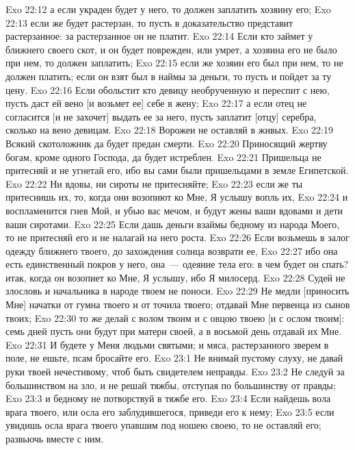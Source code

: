 \vs Exo 22:12 а если украден будет у него, то должен заплатить хозяину его;
\vs Exo 22:13 если же будет  растерзан, то пусть в доказательство представит растерзанное: за растерзанное он не платит.
\rsbpar\vs Exo 22:14 Если кто займет у ближнего своего скот, и он будет поврежден, или умрет, а хозяина его не было при нем, то должен заплатить;
\vs Exo 22:15 если же хозяин его был при нем, то не должен платить; если он взят был в наймы за деньги, то пусть и пойдет за ту цену.
\rsbpar\vs Exo 22:16 Если обольстит кто девицу необрученную и переспит с нею, пусть даст ей вено [и возьмет ее] себе в жену;
\vs Exo 22:17 а если отец не согласится [и не захочет] выдать ее за него, пусть заплатит [отцу]  серебра, сколько  на вено девицам.
\rsbpar\vs Exo 22:18 Ворожеи не оставляй в живых.
\rsbpar\vs Exo 22:19 Всякий скотоложник да будет предан смерти.
\rsbpar\vs Exo 22:20 Приносящий жертву богам, кроме одного Господа, да будет истреблен.
\rsbpar\vs Exo 22:21 Пришельца не притесняй и не угнетай его, ибо вы сами были пришельцами в земле Египетской.
\rsbpar\vs Exo 22:22 Ни вдовы, ни сироты не притесняйте;
\vs Exo 22:23 если же ты притеснишь их, то, когда они возопиют ко Мне, Я услышу вопль их,
\vs Exo 22:24 и воспламенится гнев Мой, и убью вас мечом, и будут жены ваши вдовами и дети ваши сиротами.
\rsbpar\vs Exo 22:25 Если дашь деньги взаймы бедному из народа Моего, то не притесняй его и не налагай на него роста.
\vs Exo 22:26 Если возьмешь в залог одежду ближнего твоего, до захождения солнца возврати ее,
\vs Exo 22:27 ибо она есть единственный покров у него, она~--- одеяние тела его: в чем будет он спать? итак, когда он возопиет ко Мне, Я услышу, ибо Я милосерд.
\rsbpar\vs Exo 22:28 Судей не злословь и начальника в народе твоем не поноси.
\rsbpar\vs Exo 22:29 Не медли [приносить Мне] начатки от гумна твоего и от точила твоего; отдавай Мне первенца из сынов твоих;
\vs Exo 22:30 то же делай с волом твоим и с овцою твоею [и с ослом твоим]: семь дней пусть они будут при матери своей, а в восьмой день отдавай их Мне.
\vs Exo 22:31 И будете у Меня людьми святыми; и мяса, растерзанного зверем в поле, не ешьте, псам бросайте его.
\vs Exo 23:1 Не внимай пустому слуху, не давай руки твоей нечестивому, чтоб быть свидетелем неправды.
\rsbpar\vs Exo 23:2 Не следуй за большинством на зло, и не решай тяжбы, отступая по большинству от правды;
\vs Exo 23:3 и бедному не потворствуй в тяжбе его.
\rsbpar\vs Exo 23:4 Если найдешь вола врага твоего, или осла его заблудившегося, приведи его к нему;
\vs Exo 23:5 если увидишь осла врага твоего упавшим под ношею своею, то не оставляй его; развьючь вместе с ним.
